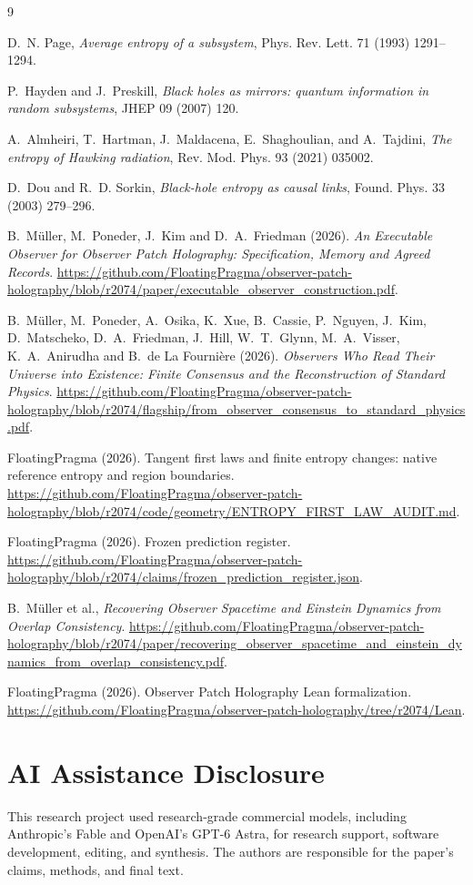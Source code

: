 \documentclass[11pt]{article}
\theoremstyle{remark}
\begin{document}
\begin{thebibliography}{9}

 D.~N. Page,
\emph{Average entropy of a subsystem},
Phys. Rev. Lett. 71 (1993) 1291--1294.

 P.~Hayden and J.~Preskill,
\emph{Black holes as mirrors: quantum information in random subsystems},
JHEP 09 (2007) 120.

 A.~Almheiri, T.~Hartman, J.~Maldacena, E.~Shaghoulian,
and A.~Tajdini,
\emph{The entropy of Hawking radiation},
Rev. Mod. Phys. 93 (2021) 035002.

 D.~Dou and R.~D. Sorkin,
\emph{Black-hole entropy as causal links},
Found. Phys. 33 (2003) 279--296.

B.~M\"uller, M.~Poneder, J.~Kim and D.~A.~Friedman (2026). \emph{An Executable
Observer for Observer Patch Holography: Specification, Memory and Agreed
Records}.
\url{https://github.com/FloatingPragma/observer-patch-holography/blob/r2074/paper/executable_observer_construction.pdf}.

B.~M\"uller, M.~Poneder, A.~Osika, K.~Xue, B.~Cassie, P.~Nguyen, J.~Kim,
D.~Matscheko, D.~A.~Friedman, J.~Hill, W.~T.~Glynn, M.~A.~Visser,
K.~A.~Anirudha and B.~de La Fourni\`ere (2026). \emph{Observers Who Read Their
Universe into Existence: Finite Consensus and the Reconstruction of Standard
Physics}.
\url{https://github.com/FloatingPragma/observer-patch-holography/blob/r2074/flagship/from_observer_consensus_to_standard_physics.pdf}.

FloatingPragma (2026). Tangent first laws and finite entropy changes:
native reference entropy and region boundaries.
\url{https://github.com/FloatingPragma/observer-patch-holography/blob/r2074/code/geometry/ENTROPY_FIRST_LAW_AUDIT.md}.

FloatingPragma (2026). Frozen prediction register.
\url{https://github.com/FloatingPragma/observer-patch-holography/blob/r2074/claims/frozen_prediction_register.json}.

B.~M\"uller et al., \emph{Recovering Observer Spacetime and Einstein Dynamics from Overlap Consistency}.
\url{https://github.com/FloatingPragma/observer-patch-holography/blob/r2074/paper/recovering_observer_spacetime_and_einstein_dynamics_from_overlap_consistency.pdf}.

FloatingPragma (2026). Observer Patch Holography Lean formalization.
\url{https://github.com/FloatingPragma/observer-patch-holography/tree/r2074/Lean}.

\end{thebibliography}

\section*{AI Assistance Disclosure}
This research project used research-grade commercial models, including
Anthropic's Fable and OpenAI's GPT-6 Astra, for research support, software
development, editing, and synthesis. The authors are responsible for the
paper's claims, methods, and final text.
\end{document}
